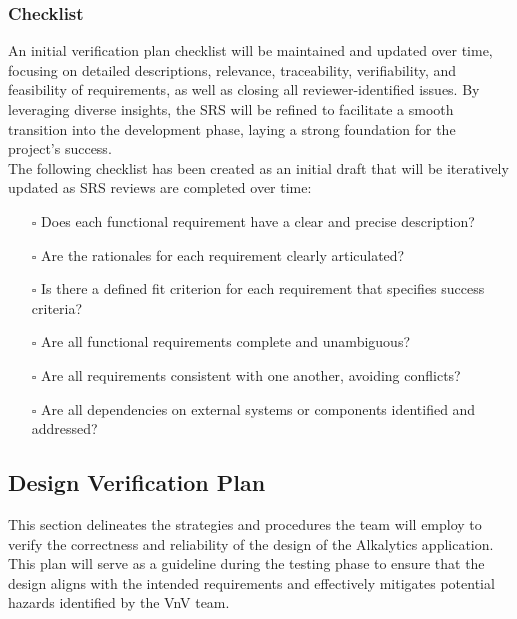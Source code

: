 \documentclass[12pt, titlepage]{article}
\begin{document}
\subsubsection{Checklist}
An initial verification plan checklist will be maintained and updated over time,
focusing on detailed descriptions, relevance, traceability, verifiability, and
feasibility of requirements, as well as closing all reviewer-identified issues.
By leveraging diverse insights, the SRS will be refined to facilitate a smooth
transition into the development phase, laying a strong foundation for the
project's success.\\
\newline
The following checklist has been created as an initial draft that will be
iteratively updated as SRS reviews are completed over time:
\begin{itemize}
  \item[$\square$] Does each functional requirement have a clear and precise
  description?
  \item[$\square$] Are the rationales for each requirement clearly articulated?
  \item[$\square$] Is there a defined fit criterion for each requirement that
  specifies success criteria?
  \item[$\square$] Are all functional requirements complete and unambiguous?
  \item[$\square$] Are all requirements consistent with one another, avoiding
  conflicts?
  \item[$\square$] Are all dependencies on external systems or components
  identified and addressed?
\end{itemize}

\subsection{Design Verification Plan}
This section delineates the strategies and procedures the team will employ to
verify the correctness and reliability of the design of the Alkalytics
application. This plan will serve as a guideline during the testing phase to
ensure that the design aligns with the intended requirements and effectively
mitigates potential hazards identified by the VnV team.
\end{document}
